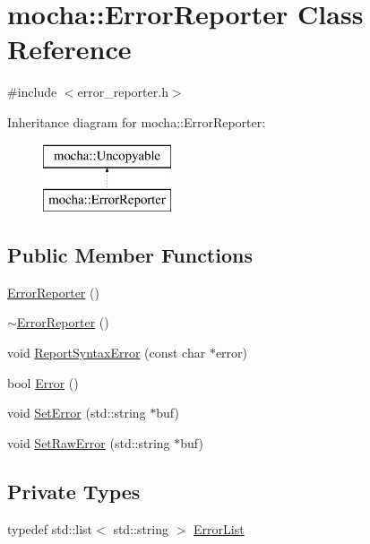 \hypertarget{classmocha_1_1_error_reporter}{
\section{mocha::ErrorReporter Class Reference}
\label{classmocha_1_1_error_reporter}
}


{\ttfamily \#include $<$error\_\-reporter.h$>$}

Inheritance diagram for mocha::ErrorReporter:\begin{figure}[H]
\begin{center}
\leavevmode
\includegraphics[height=2.000000cm]{classmocha_1_1_error_reporter}
\end{center}
\end{figure}
\subsection*{Public Member Functions}
\begin{DoxyCompactItemize}
\item 
\hyperlink{classmocha_1_1_error_reporter_afc89cfc63c5287edec01ef024d8d4c7c}{ErrorReporter} ()
\item 
\hyperlink{classmocha_1_1_error_reporter_aef46c5aa991fa162449116ca9603086f}{$\sim$ErrorReporter} ()
\item 
void \hyperlink{classmocha_1_1_error_reporter_a9eedd243ac88ad5ee6771eb07d314630}{ReportSyntaxError} (const char $\ast$error)
\item 
bool \hyperlink{classmocha_1_1_error_reporter_a852cc1783a3eef7a949b9261dfde3ac2}{Error} ()
\item 
void \hyperlink{classmocha_1_1_error_reporter_a7928e93ff0f68429463402ea7a75791b}{SetError} (std::string $\ast$buf)
\item 
void \hyperlink{classmocha_1_1_error_reporter_a26476bb615cdac43a9f885c33c62026b}{SetRawError} (std::string $\ast$buf)
\end{DoxyCompactItemize}
\subsection*{Private Types}
\begin{DoxyCompactItemize}
\item 
typedef std::list$<$ std::string $>$ \hyperlink{classmocha_1_1_error_reporter_a71817853888cbed11f8c419c384d6c1d}{ErrorList}
\end{DoxyCompactItemize}
